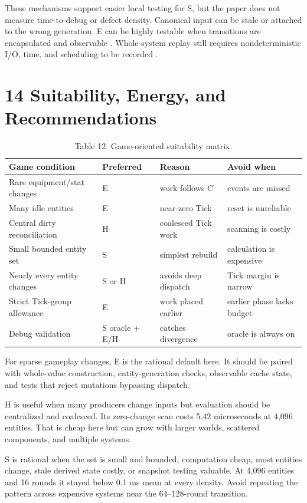 These mechanisms support easier local testing for S, but the paper does not measure time-to-debug or defect density. Canonical input can be stale or attached to the wrong generation. E can be highly testable when transitions are encapsulated and observable \cite{parnas1972}. Whole-system replay still requires nondeterministic I/O, time, and scheduling to be recorded \cite{dunlap2002,srinivasan2004}.

\section{14 Suitability, Energy, and Recommendations}

\begin{table}
\caption{Table 12. Game-oriented suitability matrix.}
\begin{tabular}{llll}
Game condition & Preferred & Reason & Avoid when \\
\hline
Rare equipment/stat changes & E & work follows \(C\) & events are missed \\
Many idle entities & E & near-zero Tick & reset is unreliable \\
Central dirty reconciliation & H & coalesced Tick work & scanning is costly \\
Small bounded entity set & S & simplest rebuild & calculation is expensive \\
Nearly every entity changes & S or H & avoids deep dispatch & Tick margin is narrow \\
Strict Tick-group allowance & E & work placed earlier & earlier phase lacks budget \\
Debug validation & S oracle + E/H & catches divergence & oracle is always on \\
\end{tabular}
\end{table}

For sparse gameplay changes, E is the rational default here. It should be paired with whole-value construction, entity-generation checks, observable cache state, and tests that reject mutations bypassing dispatch.

H is useful when many producers change inputs but evaluation should be centralized and coalesced. Its zero-change scan costs 5.42 microseconds at 4,096 entities. That is cheap here but can grow with larger worlds, scattered components, and multiple systems.

S is rational when the set is small and bounded, computation cheap, most entities change, stale derived state costly, or snapshot testing valuable. At 4,096 entities and 16 rounds it stayed below 0.1 ms mean at every density. Avoid repeating the pattern across expensive systems near the 64--128-round transition.

